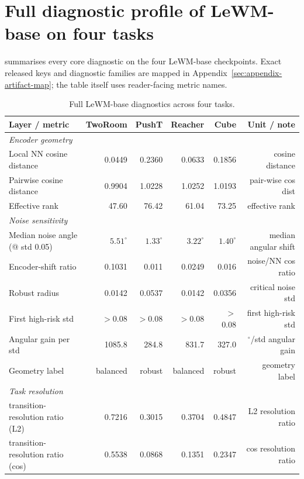 \documentclass[10pt]{article}
\newcommand{\transres}{transition-resolution ratio}
\begin{document}
\section{Full diagnostic profile of LeWM-base on four tasks}\label{sec:appendix-B}

 summarises every core diagnostic on the four LeWM-base checkpoints. Exact released keys and diagnostic families are mapped in Appendix~\ref{sec:appendix-artifact-map}; the table itself uses reader-facing metric names.

\begin{landscape}
\begin{table}[p]
\centering
\caption{Full LeWM-base diagnostics across four tasks.}
\label{tab:full-diag}
\small
\setlength{\tabcolsep}{5pt}
\begin{tabular}{lrrrrr}
\toprule
Layer / metric & TwoRoom & PushT & Reacher & Cube & Unit / note \\
\midrule
\multicolumn{6}{l}{\textit{Encoder geometry}}\\
Local NN cosine distance & 0.0449 & 0.2360 & 0.0633 & 0.1856 & cosine distance \\
Pairwise cosine distance & 0.9904 & 1.0228 & 1.0252 & 1.0193 & pair-wise cos dist \\
Effective rank & 47.60 & 76.42 & 61.04 & 73.25 & effective rank \\
\midrule
\multicolumn{6}{l}{\textit{Noise sensitivity}}\\
Median noise angle (@ std 0.05) & $5.51^{\circ}$ & $1.33^{\circ}$ & $3.22^{\circ}$ & $1.40^{\circ}$ & median angular shift \\
Encoder-shift ratio & 0.1031 & 0.011 & 0.0249 & 0.016 & noise/NN cos ratio \\
Robust radius & 0.0142 & 0.0537 & 0.0142 & 0.0356 & critical noise std \\
First high-risk std & $>$0.08 & $>$0.08 & $>$0.08 & $>$0.08 & first high-risk std \\
Angular gain per std & 1085.8 & 284.8 & 831.7 & 327.0 & $^{\circ}$/std angular gain \\
Geometry label & balanced & robust & balanced & robust & geometry label \\
\midrule
\multicolumn{6}{l}{\textit{Task resolution}}\\
\transres{} (L2) & 0.7216 & 0.3015 & 0.3704 & 0.4847 & L2 resolution ratio \\
\transres{} (cos) & 0.5538 & 0.0868 & 0.1351 & 0.2347 & cos resolution ratio \\

\end{tabular}
\end{table}
\end{landscape}
\end{document}
